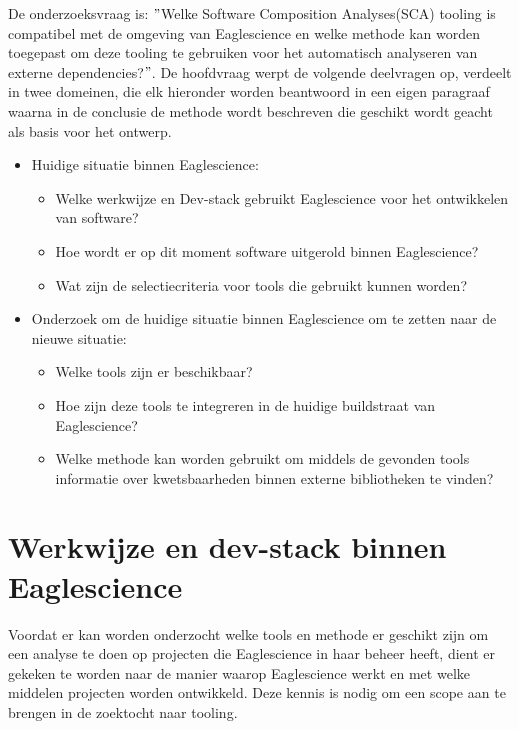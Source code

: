 De onderzoeksvraag is: $"$Welke Software Composition Analyses(SCA) tooling is compatibel met de omgeving van Eaglescience en welke methode kan worden toegepast om deze tooling te gebruiken voor het automatisch analyseren van externe dependencies?$"$. De hoofdvraag werpt de volgende deelvragen op, verdeelt in twee domeinen, die elk hieronder worden beantwoord in een eigen paragraaf waarna in de conclusie de methode wordt beschreven die geschikt wordt geacht als basis voor het ontwerp.
\begin{itemize}
    \item Huidige situatie binnen Eaglescience:
    \begin{itemize}
        \item Welke werkwijze en Dev-stack gebruikt Eaglescience voor het ontwikkelen van software?
        \item Hoe wordt er op dit moment software uitgerold binnen Eaglescience?
        \item Wat zijn de selectiecriteria voor tools die gebruikt kunnen worden?
    \end{itemize}

    \item Onderzoek om de huidige situatie binnen Eaglescience om te zetten naar de nieuwe situatie:
    \begin{itemize}
        \item Welke tools zijn er beschikbaar?
        \item Hoe zijn deze tools te integreren in de huidige buildstraat van Eaglescience?
        \item Welke methode kan worden gebruikt om middels de gevonden tools informatie over kwetsbaarheden binnen externe bibliotheken te vinden?
    \end{itemize}
\end{itemize}


\section{Werkwijze en dev-stack binnen Eaglescience}\label{sec:werkwijze-en-dev-stack-binnen-eaglescience}
Voordat er kan worden onderzocht welke tools en methode er geschikt zijn om een analyse te doen op projecten die Eaglescience in haar beheer heeft, dient er gekeken te worden naar de manier waarop Eaglescience werkt en met welke middelen projecten worden ontwikkeld. Deze kennis is nodig om een scope aan te brengen in de zoektocht naar tooling.



